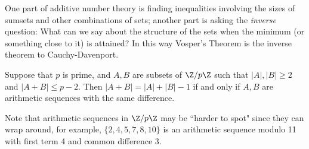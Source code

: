 One part of additive number theory is finding inequalities involving the sizes of sumsets and other combinations of sets; another part is asking the {\it inverse} question: What can we say about the structure of the sets when the minimum (or something close to it) is attained? In this way Vosper's Theorem is the inverse theorem to Cauchy-Davenport.
\begin{thm}[Vosper]\label{vosper}
Suppose that $p$ is prime, and $A,B$ are subsets of $\Z/p\Z$ such that $|A|,|B|\geq 2$ and $|A+B|\leq p-2$. Then $|A+B|=|A|+|B|-1$ if and only if $A,B$ are arithmetic sequences with the same difference.
\end{thm}
Note that arithmetic sequences in $\Z/p\Z$ may be ``harder to spot" since they can wrap around, for example, $\{2,4,5,7,8,10\}$ is an arithmetic sequence modulo 11 with first term 4 and common difference 3.

